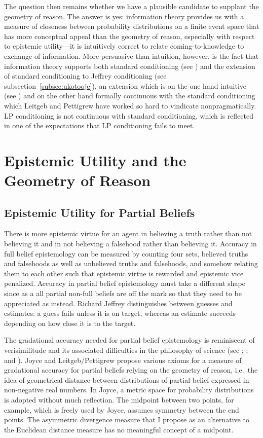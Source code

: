 \documentclass[phd,12pt,oneside]{ubcthesis}
\begin{document}
The question then remains whether we have a plausible candidate to
supplant the geometry of reason. The answer is yes: information theory
provides us with a measure of closeness between probability
distributions on a finite event space that has more conceptual appeal
than the geometry of reason, especially with respect to epistemic
utility---it is intuitively correct to relate coming-to-knowledge to
exchange of information. More persuasive than intuition, however, is
the fact that information theory supports both standard conditioning
(see ) and the extension of standard
conditioning to Jeffrey conditioning (see
subsection~\ref{subsec:ukotooje}), an extension which is on the one
hand intuitive (see ) and on the other hand
formally continuous with the standard conditioning which Leitgeb and
Pettigrew have worked so hard to vindicate nonpragmatically. LP
conditioning is not continuous with standard conditioning, which is
reflected in one of the expectations that LP conditioning fails to
meet.

\section{Epistemic Utility and the Geometry of Reason}
\label{sec:chuweiyo}

\subsection{Epistemic Utility for Partial Beliefs}
\label{subsec:oochihei}

There is more epistemic virtue for an agent in believing a truth
rather than not believing it and in not believing a falsehood rather
than believing it. Accuracy in full belief epistemology can be
measured by counting four sets, believed truths and falsehoods as well
as unbelieved truths and falsehoods, and somehow relating them to each
other such that epistemic virtue is rewarded and epistemic vice
penalized. Accuracy in partial belief epistemology must take a
different shape since as a  all partial non-full beliefs
are off the mark so that they need to be appreciated as
 instead. Richard Jeffrey distinguishes between
guesses and estimates: a guess fails unless it is on target, whereas
an estimate succeeds depending on how close it is to the target.

The gradational accuracy needed for partial belief epistemology is
reminiscent of verisimilitude and its associated difficulties in the
philosophy of science (see ;
; and ). Joyce and
Leitgeb/Pettigrew propose various axioms for a measure of gradational
accuracy for partial beliefs relying on the geometry of reason, i.e.\
the idea of geometrical distance between distributions of partial
belief expressed in non-negative real numbers. In Joyce, a metric
space for probability distributions is adopted without much
reflection. The midpoint between two points, for example, which is
freely used by Joyce, assumes symmetry between the end points. The
asymmetric divergence measure that I propose as an alternative to the
Euclidean distance measure has no meaningful concept of a midpoint.
\end{document}
